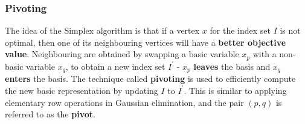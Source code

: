 \documentclass[a4paper, 12pt]{article}
\begin{document}
            \subsubsection*{Pivoting}
                The idea of the Simplex algorithm is that if a vertex $x$ for the index set $I$ is not optimal, then one of its neighbouring vertices will have a \textbf{better objective value}.
                Neighbouring are obtained by swapping a basic variable $x_p$ with a non-basic variable $x_q$, to obtain a new index set $I^\prime$ - $x_p$ \textbf{leaves} the basis and $x_q$ \textbf{enters} the basis.
                The technique called \textbf{pivoting} is used to efficiently compute the new basic representation by updating $I$ to $I^\prime$.
                This is similar to applying elementary row operations in Gaussian elimination, and the pair $(p, q)$ is referred to as the \textbf{pivot}.
                \medskip
\end{document}
